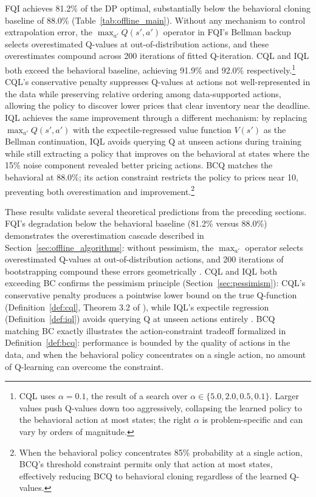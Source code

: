 \begin{table}[t]
\centering
\caption{Policy value for each offline RL method, expressed as mean return and percentage of the DP optimal. Standard errors computed over 20 seeds.}
\label{tab:offline_main}

\end{table}

FQI achieves 81.2\% of the DP optimal, substantially below the behavioral cloning baseline of 88.0\% (Table~\ref{tab:offline_main}). Without any mechanism to control extrapolation error, the $\max_{a'} Q(s', a')$ operator in FQI's Bellman backup selects overestimated Q-values at out-of-distribution actions, and these overestimates compound across 200 iterations of fitted Q-iteration. CQL and IQL both exceed the behavioral baseline, achieving 91.9\% and 92.0\% respectively.\footnote{CQL uses $\alpha = 0.1$, the result of a search over $\alpha \in \{5.0, 2.0, 0.5, 0.1\}$. Larger values push Q-values down too aggressively, collapsing the learned policy to the behavioral action at most states; the right $\alpha$ is problem-specific and can vary by orders of magnitude.} CQL's conservative penalty suppresses Q-values at actions not well-represented in the data while preserving relative ordering among data-supported actions, allowing the policy to discover lower prices that clear inventory near the deadline. IQL achieves the same improvement through a different mechanism: by replacing $\max_{a'} Q(s', a')$ with the expectile-regressed value function $V(s')$ as the Bellman continuation, IQL avoids querying Q at unseen actions during training while still extracting a policy that improves on the behavioral at states where the 15\% noise component revealed better pricing actions. BCQ matches the behavioral at 88.0\%; its action constraint restricts the policy to prices near 10, preventing both overestimation and improvement.\footnote{When the behavioral policy concentrates 85\% probability at a single action, BCQ's threshold constraint permits only that action at most states, effectively reducing BCQ to behavioral cloning regardless of the learned Q-values.}

These results validate several theoretical predictions from the preceding sections. FQI's degradation below the behavioral baseline (81.2\% versus 88.0\%) demonstrates the overestimation cascade described in Section~\ref{sec:offline_algorithms}: without pessimism, the $\max_{a'}$ operator selects overestimated Q-values at out-of-distribution actions, and 200 iterations of bootstrapping compound these errors geometrically \citep{Fujimoto2019}. CQL and IQL both exceeding BC confirms the pessimism principle (Section~\ref{sec:pessimism}): CQL's conservative penalty produces a pointwise lower bound on the true Q-function (Definition~\ref{def:cql}, Theorem 3.2 of \citealt{Kumar2020}), while IQL's expectile regression (Definition~\ref{def:iql}) avoids querying Q at unseen actions entirely \citep{Kostrikov2022}. BCQ matching BC exactly illustrates the action-constraint tradeoff formalized in Definition~\ref{def:bcq}: performance is bounded by the quality of actions in the data, and when the behavioral policy concentrates on a single action, no amount of Q-learning can overcome the constraint.

